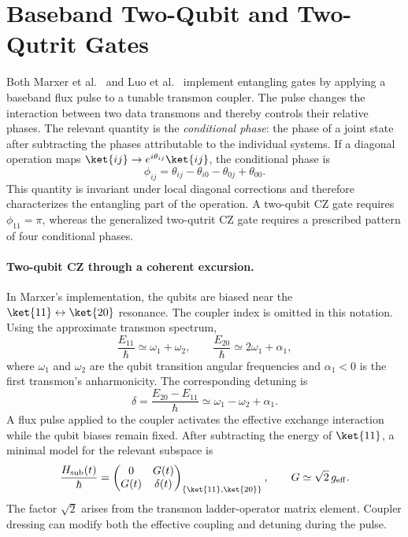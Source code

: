 \section{Baseband Two-Qubit and Two-Qutrit Gates}
\label{sec:baseband-gates}

Both Marxer et al.~\cite{Marxer2023} and Luo et al.~\cite{Luo2023}
implement entangling gates by applying a baseband flux pulse to a
tunable transmon coupler. The pulse changes the interaction between
two data transmons and thereby controls their relative phases.
The relevant quantity is the \emph{conditional phase}: the phase of
a joint state after subtracting the phases attributable to the
individual systems. If a diagonal operation maps
$\ket{ij}\rightarrow e^{i\theta_{ij}}\ket{ij}$, the conditional
phase is
\begin{equation}
    \phi_{ij}
    = \theta_{ij}-\theta_{i0}-\theta_{0j}+\theta_{00}.
    \label{eq:conditional-phase}
\end{equation}
This quantity is invariant under local diagonal corrections and
therefore characterizes the entangling part of the operation.
A two-qubit CZ gate requires $\phi_{11}=\pi$, whereas the
generalized two-qutrit CZ gate requires a prescribed pattern of
four conditional phases.

\paragraph{Two-qubit CZ through a coherent excursion.}

In Marxer's implementation, the qubits are biased near the
$\ket{11}\leftrightarrow\ket{20}$ resonance. The coupler index is
omitted in this notation. Using the approximate transmon spectrum,
\begin{equation}
    \frac{E_{11}}{\hbar}\simeq\omega_1+\omega_2,
    \qquad
    \frac{E_{20}}{\hbar}\simeq2\omega_1+\alpha_1,
\end{equation}
where $\omega_1$ and $\omega_2$ are the qubit transition angular
frequencies and $\alpha_1<0$ is the first transmon's anharmonicity.
The corresponding detuning is
\begin{equation}
    \delta
    = \frac{E_{20}-E_{11}}{\hbar}
    \simeq\omega_1-\omega_2+\alpha_1.
\end{equation}
A flux pulse applied to the coupler activates the effective
exchange interaction while the qubit biases remain fixed.
After subtracting the energy of $\ket{11}$, a minimal model for
the relevant subspace is
\begin{equation}
    \frac{H_{\mathrm{sub}}(t)}{\hbar}
    =
    \begin{pmatrix}
        0 & G(t)\\
        G(t) & \delta(t)
    \end{pmatrix}_{\{\ket{11},\ket{20}\}},
    \qquad
    G\simeq\sqrt{2}\,g_{\mathrm{eff}}.
    \label{eq:two-state-model}
\end{equation}
The factor $\sqrt{2}$ arises from the transmon ladder-operator
matrix element. Coupler dressing can modify both the effective
coupling and detuning during the pulse.

